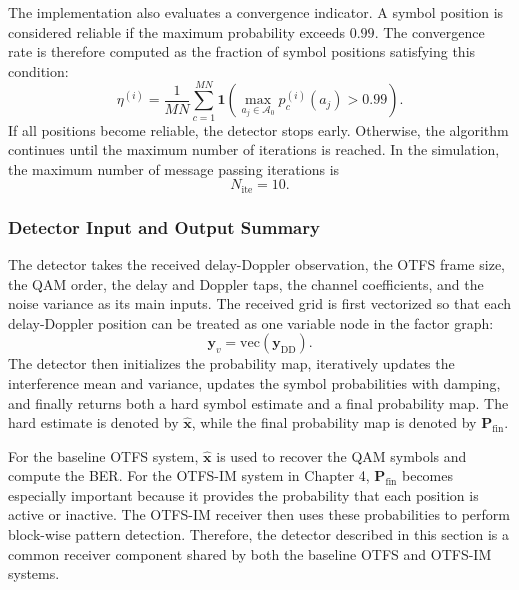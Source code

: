 The implementation also evaluates a convergence indicator. A symbol position is considered reliable if the maximum probability exceeds \(0.99\). The convergence rate is therefore computed as the fraction of symbol positions satisfying this condition:
\begin{equation}
    \eta^{(i)}
    =
    \frac{1}{MN}
    \sum_{c=1}^{MN}
    \mathbf{1}
    \left(
    \max_{a_j\in\mathcal{A}_{0}} p_c^{(i)}(a_j) > 0.99
    \right).
\end{equation}
If all positions become reliable, the detector stops early. Otherwise, the algorithm continues until the maximum number of iterations is reached. In the simulation, the maximum number of message passing iterations is
\begin{equation}
    N_{\mathrm{ite}} = 10.
\end{equation}

\subsubsection{Detector Input and Output Summary}

The detector takes the received delay-Doppler observation, the OTFS frame size, the QAM order, the delay and Doppler taps, the channel coefficients, and the noise variance as its main inputs. The received grid is first vectorized so that each delay-Doppler position can be treated as one variable node in the factor graph:
\begin{equation}
    \mathbf{y}_{v}
    =
    \mathrm{vec}\!\left(\mathbf{y}_{\mathrm{DD}}\right).
    \label{eq:mp_received_vectorization}
\end{equation}
The detector then initializes the probability map, iteratively updates the interference mean and variance, updates the symbol probabilities with damping, and finally returns both a hard symbol estimate and a final probability map. The hard estimate is denoted by \(\widehat{\mathbf{x}}\), while the final probability map is denoted by \(\mathbf{P}_{\mathrm{fin}}\).

For the baseline OTFS system, \(\widehat{\mathbf{x}}\) is used to recover the QAM symbols and compute the BER. For the OTFS-IM system in Chapter 4, \(\mathbf{P}_{\mathrm{fin}}\) becomes especially important because it provides the probability that each position is active or inactive. The OTFS-IM receiver then uses these probabilities to perform block-wise pattern detection. Therefore, the detector described in this section is a common receiver component shared by both the baseline OTFS and OTFS-IM systems.

